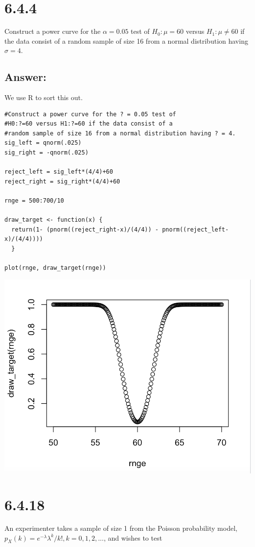 \documentclass[svgnames]{article}
\begin{document}
\section{6.4.4}
Construct a power curve for the $\alpha = 0.05$ test of $H_0: \mu = 60$ versus $H_1: \mu \neq 60$ if the data consist of a random sample of size 16 from a normal distribution having $\sigma = 4$.
\subsection*{Answer:}
We use R to sort this out. 

\begin{lstlisting}
#Construct a power curve for the ? = 0.05 test of 
#H0:?=60 versus H1:?=60 if the data consist of a
#random sample of size 16 from a normal distribution having ? = 4.
sig_left = qnorm(.025)
sig_right = -qnorm(.025)

reject_left = sig_left*(4/4)+60
reject_right = sig_right*(4/4)+60

rnge = 500:700/10

draw_target <- function(x) {
  return(1- (pnorm((reject_right-x)/(4/4)) - pnorm((reject_left-x)/(4/4))))
  }

plot(rnge, draw_target(rnge))
\end{lstlisting}
\includegraphics[scale=1.05]{PowerCurve}

\section{6.4.18}
An experimenter takes a sample of size 1 from the Poisson probability model, $p_X(k) = e^{-\lambda}\lambda^k/k!, k = 0, 1, 2,... $, and wishes to test
\end{document}
